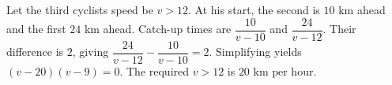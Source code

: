 Let the third cyclist\textquotesingle s speed be $v>12$. At his start, the second is $10$ km ahead and the first $24$ km ahead. Catch-up times are $\dfrac{10}{v-10}$ and $\dfrac{24}{v-12}$. Their difference is $2$, giving $\dfrac{24}{v-12}-\dfrac{10}{v-10}=2$. Simplifying yields $(v-20)(v-9)=0$. The required $v>12$ is $\boxed{20\text{ km per hour}}$.
